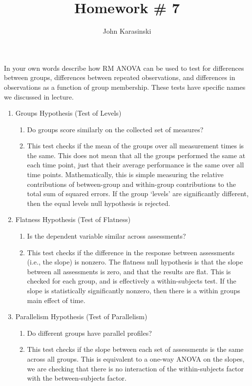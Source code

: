 \documentclass[onecolumn,10pt]{jhwhw}
\author{John Karasinski}
\title{Homework \# 7}
\begin{document}

\problem{}
In your own words describe how RM ANOVA can be used to test for differences between groups, differences between repeated observations, and differences in observations as a function of group membership. These tests have specific names we discussed in lecture.\\

\begin{enumerate}
\item Groups Hypothesis (Test of Levels)
\begin{enumerate}
\item Do groups score similarly on the collected set of measures?
\item This test checks if the mean of the groups over all measurement times is the same. This does not mean that all the groups performed the same at each time point, just that their average performance is the same over all time points. Mathematically, this is simple measuring the relative contributions of between-group and within-group contributions to the total sum of squared errors. If the group `levels' are significantly different, then the equal levels null hypothesis is rejected.
\end{enumerate}
\item Flatness Hypothesis (Test of Flatness)
\begin{enumerate}
\item Is the dependent variable similar across assessments?
\item This test checks if the difference in the response between assessments (i.e., the slope) is nonzero. The flatness null hypothesis is that the slope between all assessments is zero, and that the results are flat. This is checked for each group, and is effectively a within-subjects test. If the slope is statistically significantly nonzero, then there is a within groups main effect of time.
\end{enumerate}
\item Parallelism Hypothesis (Test of Parallelism)
\begin{enumerate}
\item Do different groups have parallel profiles?
\item This test checks if the slope between each set of assessments is the same across all groups. This is equivalent to a one-way ANOVA on the slopes, we are checking that there is no interaction of the within-subjects factor with the between-subjects factor.
\end{enumerate}
\end{enumerate}
\end{document}
